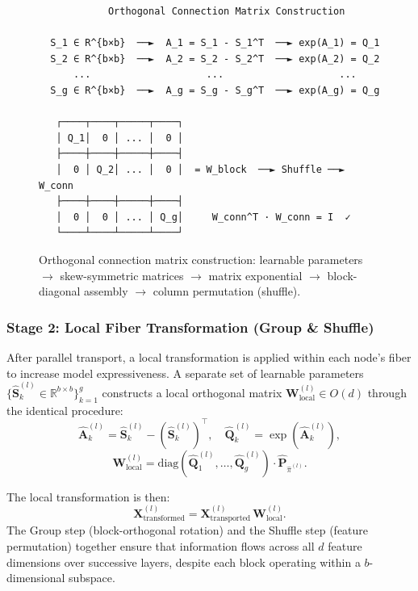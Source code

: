 \begin{figure}[h]
\centering
\begin{verbatim}
            Orthogonal Connection Matrix Construction

  S_1 ∈ R^{b×b}  ──►  A_1 = S_1 - S_1^T  ──► exp(A_1) = Q_1
  S_2 ∈ R^{b×b}  ──►  A_2 = S_2 - S_2^T  ──► exp(A_2) = Q_2
      ...                    ...                    ...
  S_g ∈ R^{b×b}  ──►  A_g = S_g - S_g^T  ──► exp(A_g) = Q_g

   ┌────┬────┬─────┬────┐
   │ Q_1│  0 │ ... │  0 │
   ├────┼────┼─────┼────┤
   │  0 │ Q_2│ ... │  0 │  = W_block  ──► Shuffle ──► W_conn
   ├────┼────┼─────┼────┤
   │  0 │  0 │ ... │ Q_g│     W_conn^T · W_conn = I  ✓
   └────┴────┴─────┴────┘
\end{verbatim}
\caption{Orthogonal connection matrix construction: learnable parameters $\to$ skew-symmetric matrices $\to$ matrix exponential $\to$ block-diagonal assembly $\to$ column permutation (shuffle).}
\label{fig:connection}
\end{figure}


\subsubsection{Stage 2: Local Fiber Transformation (Group \& Shuffle)}

After parallel transport, a local transformation is applied within each node's fiber to increase model expressiveness. A separate set of learnable parameters $\{\hat{\mathbf{S}}_k^{(l)} \in \mathbb{R}^{b \times b}\}_{k=1}^{g}$ constructs a local orthogonal matrix $\mathbf{W}_{\text{local}}^{(l)} \in O(d)$ through the identical procedure:
\begin{equation}
    \hat{\mathbf{A}}_k^{(l)} = \hat{\mathbf{S}}_k^{(l)} - \left(\hat{\mathbf{S}}_k^{(l)}\right)^\top, \quad
    \hat{\mathbf{Q}}_k^{(l)} = \exp\!\left(\hat{\mathbf{A}}_k^{(l)}\right),
\end{equation}
\begin{equation}
    \mathbf{W}_{\text{local}}^{(l)} = \text{diag}\!\left(\hat{\mathbf{Q}}_1^{(l)}, \ldots, \hat{\mathbf{Q}}_g^{(l)}\right) \cdot \hat{\mathbf{P}}_{\hat\pi^{(l)}}.
\end{equation}

The local transformation is then:
\begin{equation}
    \mathbf{X}_{\text{transformed}}^{(l)} = \mathbf{X}_{\text{transported}}^{(l)} \, \mathbf{W}_{\text{local}}^{(l)}.
\end{equation}
The Group step (block-orthogonal rotation) and the Shuffle step (feature permutation) together ensure that information flows across all $d$ feature dimensions over successive layers, despite each block operating within a $b$-dimensional subspace.


